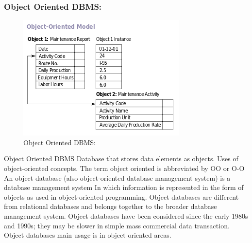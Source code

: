 \documentclass[14pt]{article} %
\begin{document}
\subsubsection{\textbf{Object Oriented DBMS:}}
 \begin{figure}[H]
    \centerline{\includegraphics[width=0.65\linewidth]{object.png}}
  \caption{Object Oriented DBMS:}
  \label{fig:figure 12}
\end{figure}
Object Oriented DBMS Database that stores data elements as objects. Uses of object-oriented concepts. The term object oriented is abbreviated by OO or O-O
An object database (also object-oriented database management system) is a database management system 
In which information is represented in the form of objects as used in object-oriented programming. Object databases are different from relational databases and belongs together to the broader database management system.
Object databases have been considered since the early 1980s and 1990s; they may be slower in simple mass commercial data transaction. Object databases main usage is in object oriented areas. 
      
                           
\end{document}
